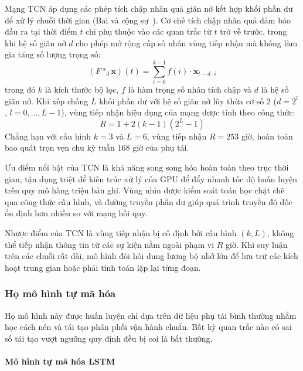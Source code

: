 Mạng TCN áp dụng các phép tích chập nhân quả giãn nở kết hợp khối phần dư để xử lý chuỗi thời gian (Bai và cộng sự~\cite{tcn}). Cơ chế tích chập nhân quả đảm bảo đầu ra tại thời điểm $t$ chỉ phụ thuộc vào các quan trắc từ $t$ trở về trước, trong khi hệ số giãn nở $d$ cho phép mở rộng cấp số nhân vùng tiếp nhận mà không làm gia tăng số lượng trọng số:
\begin{equation*}
    (F *_d \mathbf{x})(t) = \sum_{i=0}^{k-1} f(i) \cdot \mathbf{x}_{t - d \cdot i}
\end{equation*}
trong đó $k$ là kích thước bộ lọc, $f$ là hàm trọng số nhân tích chập và $d$ là hệ số giãn nở. Khi xếp chồng $L$ khối phần dư với hệ số giãn nở lũy thừa cơ số 2 ($d = 2^l$, $l = 0, \ldots, L-1$), vùng tiếp nhận hiệu dụng của mạng được tính theo công thức:
\begin{equation*}
    R = 1 + 2(k - 1)\left(2^{L} - 1\right)
\end{equation*}
Chẳng hạn với cấu hình $k = 3$ và $L = 6$, vùng tiếp nhận $R = 253$ giờ, hoàn toàn bao quát trọn vẹn chu kỳ tuần 168 giờ của phụ tải.

Ưu điểm nổi bật của TCN là khả năng song song hóa hoàn toàn theo trục thời gian, tận dụng triệt để kiến trúc xử lý của GPU để đẩy nhanh tốc độ huấn luyện trên quy mô hàng triệu bản ghi. Vùng nhìn được kiểm soát toán học chặt chẽ qua công thức cấu hình, và đường truyền phần dư giúp quá trình truyền độ dốc ổn định hơn nhiều so với mạng hồi quy.

Nhược điểm của TCN là vùng tiếp nhận bị cố định bởi cấu hình $(k, L)$, không thể tiếp nhận thông tin từ các sự kiện nằm ngoài phạm vi $R$ giờ. Khi suy luận trên các chuỗi rất dài, mô hình đòi hỏi dung lượng bộ nhớ lớn để lưu trữ các kích hoạt trung gian hoặc phải tính toán lặp lại từng đoạn.

\subsubsection{Họ mô hình tự mã hóa}

Họ mô hình này được huấn luyện chỉ dựa trên dữ liệu phụ tải bình thường nhằm học cách nén và tái tạo phân phối vận hành chuẩn. Bất kỳ quan trắc nào có sai số tái tạo vượt ngưỡng quy định đều bị coi là bất thường.

\paragraph{Mô hình tự mã hóa LSTM}

